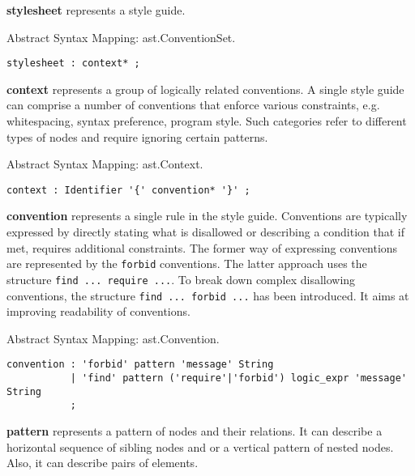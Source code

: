 \documentclass[parskip=full]{uvamscse}
\begin{document}
\begin{description}

\item\textbf{stylesheet} represents a style guide.

Abstract Syntax Mapping: ast.ConventionSet.

\begin{snippet}
\begin{verbatim}
stylesheet : context* ;
\end{verbatim}
\end{snippet}

\item\textbf{context} represents a group of logically related conventions. A single style guide can comprise a number of conventions that enforce various constraints, e.g. whitespacing, syntax preference, program style. Such categories refer to different types of nodes and require ignoring certain patterns.  

Abstract Syntax Mapping: ast.Context.

\begin{snippet}
\begin{verbatim}
context : Identifier '{' convention* '}' ;
\end{verbatim}
\end{snippet}

\item\textbf{convention} represents a single rule in the style guide. Conventions are typically expressed by directly stating what is disallowed or describing a condition that if met, requires additional constraints. The former way of expressing conventions are represented by the \texttt{forbid} conventions. The latter approach uses the structure \texttt{find ... require ...}. To break down complex disallowing conventions, the structure \texttt{find ... forbid ...} has been introduced. It aims at improving readability of conventions. 

Abstract Syntax Mapping: ast.Convention.

\begin{snippet}
\begin{verbatim}
convention : 'forbid' pattern 'message' String
           | 'find' pattern ('require'|'forbid') logic_expr 'message' String
           ;
\end{verbatim}
\end{snippet}

\item\textbf{pattern} represents a pattern of nodes and their relations. It can describe a horizontal sequence of sibling nodes and or a vertical pattern of nested nodes. Also, it can describe pairs of elements. 


\end{description}
\end{document}
